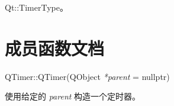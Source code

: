 \begin{notice}[另请参阅]
 Qt::TimerType。
\end{notice}

\section{成员函数文档}

QTimer::QTimer(QObject \emph{*parent} = nullptr)

使用给定的 \emph{parent} 构造一个定时器。















